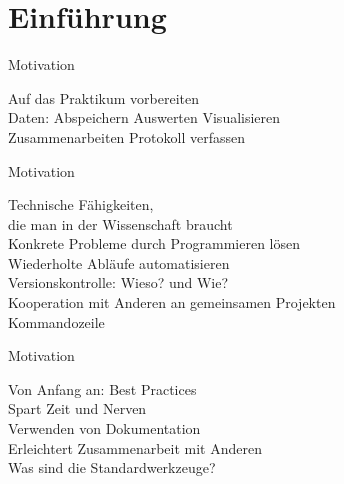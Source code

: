 \section{Einführung}


\begin{frame}{Motivation}
  \begin{center}
    \textcolor{vertexDarkRed}{\Huge Auf das Praktikum vorbereiten} \\[\baselineskip]
    \Large Daten:\hspace{2em} Abspeichern \hspace{2em} Auswerten \hspace{2em} Visualisieren \\ [\baselineskip]
    Zusammenarbeiten \hspace{2em} Protokoll verfassen\\
  \end{center}
\end{frame}

\begin{frame}{Motivation}
  \begin{center}
    \textcolor{vertexDarkRed}{\Huge Technische Fähigkeiten,\\ die man in der Wissenschaft braucht} \\[\baselineskip]
    \Large%
    Konkrete Probleme durch Programmieren lösen\\[\baselineskip]
    Wiederholte Abläufe automatisieren\\[\baselineskip]
    Versionskontrolle: Wieso? und Wie?\\[\baselineskip]
    Kooperation mit Anderen an gemeinsamen Projekten\\[\baselineskip]
    Kommandozeile
  \end{center}
\end{frame}

\begin{frame}{Motivation}
  \begin{center}
    \textcolor{vertexDarkRed}{\Huge Von Anfang an: Best Practices} \\[\baselineskip]
    \Large%
    Spart Zeit und Nerven\\[\baselineskip]
    Verwenden von Dokumentation\\[\baselineskip]
    Erleichtert Zusammenarbeit mit Anderen\\[\baselineskip]
    Was sind die Standardwerkzeuge?
  \end{center}
\end{frame}


